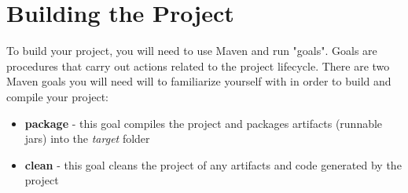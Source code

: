 \documentclass{article}
\begin{document}




\section{Building the Project} %
\label{section:build}
To build your project, you will need to use Maven and run "goals". Goals are procedures that carry out actions related to the project lifecycle. There are two Maven goals you will need will to familiarize yourself with in order to build and compile your project:
\begin{itemize}
\item \textbf{package} - this goal compiles the project and packages artifacts (runnable jars) into the \textit{target} folder
\item \textbf{clean} - this goal cleans the project of any artifacts and code generated by the project
\end{itemize}

\end{document}
